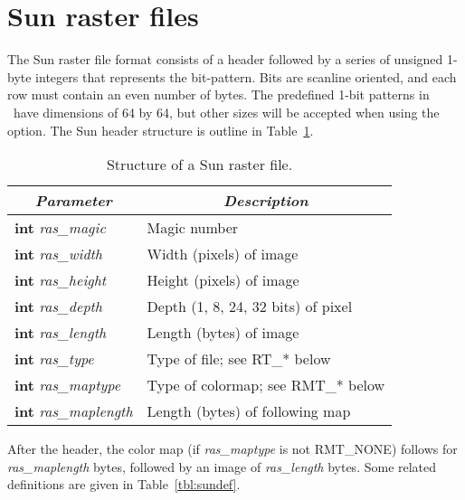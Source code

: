 \section{Sun raster files}

The Sun raster file format consists of a header followed by a series
of unsigned 1-byte integers that represents the bit-pattern.  Bits
are scanline oriented, and each row must contain an even number of
bytes.  The predefined 1-bit
patterns in \GMT\ have dimensions of 64 by 64, but other sizes will be
accepted when using the  option.  The Sun header structure
is outline in Table~\ref{tbl:sunheader}.

\begin{table}[H]
\centering

\begin{tabular}{|l|l|}  \hline
\multicolumn{1}{|c}{\emph{Parameter}}   &       \multicolumn{1}{|c|}{\emph{Description}}        \\ \hline
\textbf{int} \emph{ras\_magic}      &       Magic number  \\ \hline
\textbf{int} \emph{ras\_width}      &       Width (pixels) of image  \\ \hline
\textbf{int} \emph{ras\_height}     &       Height (pixels) of image  \\ \hline
\textbf{int} \emph{ras\_depth}      &       Depth (1, 8, 24, 32 bits) of pixel  \\ \hline
\textbf{int} \emph{ras\_length}     &       Length (bytes) of image  \\ \hline
\textbf{int} \emph{ras\_type}       &       Type of file; see RT\_* below  \\ \hline
\textbf{int} \emph{ras\_maptype}    &       Type of colormap; see RMT\_* below  \\ \hline
\textbf{int} \emph{ras\_maplength}  &       Length (bytes) of following map  \\ \hline
\end{tabular}

\caption{Structure of a Sun raster file.}
\label{tbl:sunheader}
\end{table}

After the header, the color map (if \emph{ras\_maptype} is not RMT\_NONE)
follows for \emph{ras\_maplength} bytes, followed by an image of
\emph{ras\_length} bytes.  Some related definitions are given in Table~\ref{tbl:sundef}.

